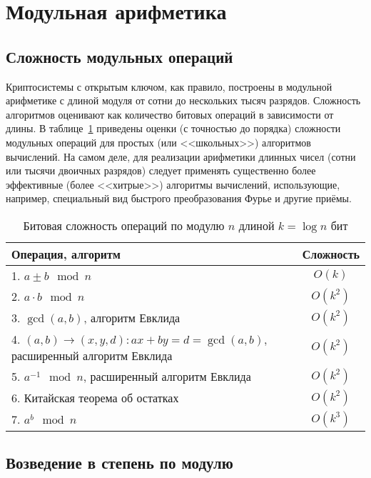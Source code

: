 \section{Модульная арифметика}\label{section-modular-arithmetic}

\subsection{Сложность модульных операций}

Криптосистемы с открытым ключом, как правило, построены в модульной арифметике с длиной модуля от сотни до нескольких тысяч разрядов. Сложность алгоритмов оценивают как количество битовых операций в зависимости от длины. В таблице~\ref{tab:mod-binary-complexity} приведены оценки (с точностью до порядка) сложности модульных операций для простых (или <<школьных>>) алгоритмов вычислений. На самом деле, для реализации арифметики длинных чисел (сотни или тысячи двоичных разрядов) следует применять существенно более эффективные (более <<хитрые>>) алгоритмы вычислений, использующие, например, специальный вид быстрого преобразования Фурье и другие приёмы.

\begin{table}[!ht]
    \centering
    \caption{Битовая сложность операций по модулю $n$ длиной $k= \log n$ бит\label{tab:mod-binary-complexity}}
    \begin{tabular}{| p{} | c |}
        \hline
        Операция, алгоритм & Сложность \\
        \hline
        1. $a \pm b \mod n$ & $O(k)$ \\
        2. $a \cdot b \mod n$ & $O(k^2)$ \\
        3. $\gcd(a, b)$, алгоритм Евклида & $O(k^2)$ \\
        4. $(a,b) \rightarrow (x,y,d) : ax + by = d = \gcd(a,b)$, расширенный алгоритм Евклида & $O(k^2)$ \\
        5. $a^{-1} \mod n$, расширенный алгоритм Евклида & $O(k^2)$ \\
        6. Китайская теорема об остатках & $O(k^2)$ \\
        7. $a^b \mod n$ & $O(k^3)$ \\
        \hline
    \end{tabular}

\end{table}

\subsection{Возведение в степень по модулю}

